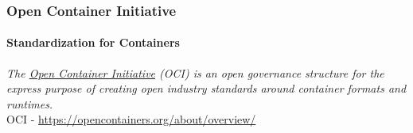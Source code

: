 \begin{frame}
    \frametitle{Open Container Initiative}
    \framesubtitle{Standardization for Containers}
    \centering\textit{
        The \href{https://opencontainers.org/}{Open Container Initiative} (OCI) is an open governance structure
        for the express purpose of creating open industry standards around container formats and runtimes.
    }\\
    \vspace{1cm}
    \centering OCI - \url{https://opencontainers.org/about/overview/}
\end{frame}